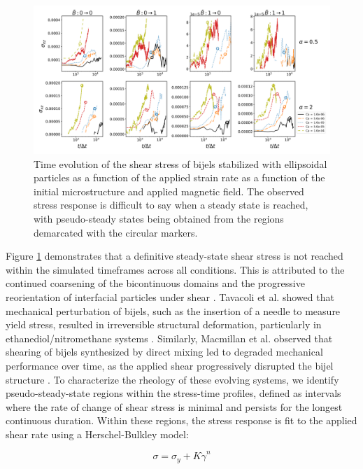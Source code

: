 \begin{figure} 
    \centering 
    \includegraphics[scale=0.3]{../figures/results/paper3/stress-time_compare.png} 
    \caption{Time evolution of the shear stress of bijels stabilized with ellipsoidal particles as a function of the applied strain rate as
             a function of the initial microstructure and applied magnetic field. The observed stress response is difficult to say when a steady
             state is reached, with pseudo-steady states being obtained from the regions demarcated with the circular markers.} 
    \label{fig:stress_time} 
\end{figure}

Figure \ref{fig:stress_time} demonstrates that a definitive steady-state shear stress is not reached within the simulated timeframes across all conditions. 
This is attributed to the continued coarsening of the bicontinuous domains and the progressive reorientation of interfacial 
particles under shear \cite{tavacoli_novel_2011, macmillan_rheological_2019}. Tavacoli et al. showed that mechanical perturbation of bijels, such as the 
insertion of a needle to measure yield stress, resulted in irreversible structural deformation, particularly in ethanediol/nitromethane systems 
\cite{tavacoli_novel_2011}. Similarly, Macmillan et al. observed that shearing of bijels synthesized by direct mixing led to degraded mechanical performance 
over time, as the applied shear progressively disrupted the bijel structure \cite{macmillan_rheological_2019}. To characterize the rheology 
of these evolving systems, we identify pseudo-steady-state regions within the stress-time profiles, defined as intervals where the rate of change of shear 
stress is minimal and persists for the longest continuous duration. Within these regions, the stress response is fit to the applied shear rate using a 
Herschel-Bulkley model:  

\begin{equation}
    \sigma = \sigma_{y} + K\dot{\gamma}^{n}    
\end{equation}

